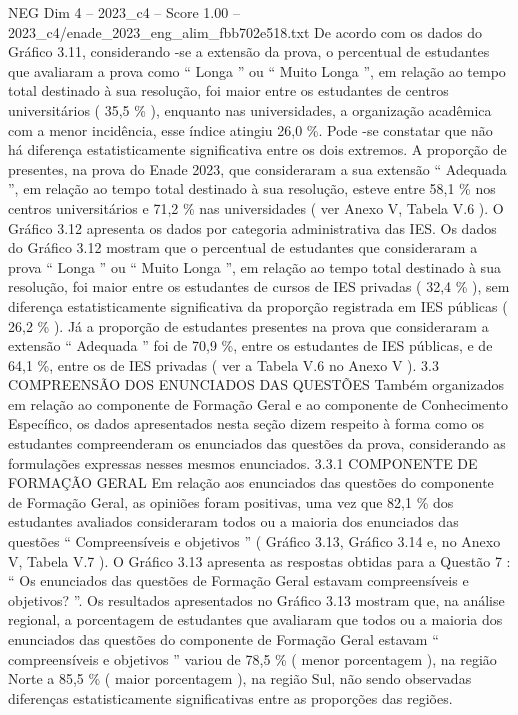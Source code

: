 \begin{textsample}{NEG Dim 4 – 2023\_c4 – Score 1.00 – 2023\_c4/enade\_2023\_eng\_alim\_fbb702e518.txt}
De acordo com os dados do Gráfico 3.11, considerando -se a extensão da prova, o percentual de estudantes que avaliaram a prova como “ Longa ” ou “ Muito Longa ”, em relação ao tempo total destinado à sua resolução, foi maior entre os estudantes de centros universitários ( 35,5 \% ), enquanto nas universidades, a organização acadêmica com a menor incidência, esse índice atingiu 26,0 \%.
Pode -se constatar que não há diferença estatisticamente significativa entre os dois extremos.
A proporção de presentes, na prova do Enade 2023, que consideraram a sua extensão “ Adequada ”, em relação ao tempo total destinado à sua resolução, esteve entre 58,1 \% nos centros universitários e 71,2 \% nas universidades ( ver Anexo V, Tabela V.6 ).
O Gráfico 3.12 apresenta os dados por categoria administrativa das IES.
Os dados do Gráfico 3.12 mostram que o percentual de estudantes que consideraram a prova “ Longa ” ou “ Muito Longa ”, em relação ao tempo total destinado à sua resolução, foi maior entre os estudantes de cursos de IES privadas ( 32,4 \% ), sem diferença estatisticamente significativa da proporção registrada em IES públicas ( 26,2 \% ).
Já a proporção de estudantes presentes na prova que consideraram a extensão “ Adequada ” foi de 70,9 \%, entre os estudantes de IES públicas, e de 64,1 \%, entre os de IES privadas ( ver a Tabela V.6 no Anexo V ). 3.3 COMPREENSÃO DOS ENUNCIADOS DAS QUESTÕES Também organizados em relação ao componente de Formação Geral e ao componente de Conhecimento Específico, os dados apresentados nesta seção dizem respeito à forma como os estudantes compreenderam os enunciados das questões da prova, considerando as formulações expressas nesses mesmos enunciados. 3.3.1 COMPONENTE DE FORMAÇÃO GERAL Em relação aos enunciados das questões do componente de Formação Geral, as opiniões foram positivas, uma vez que 82,1 \% dos estudantes avaliados consideraram todos ou a maioria dos enunciados das questões “ Compreensíveis e objetivos ” ( Gráfico 3.13, Gráfico 3.14 e, no Anexo V, Tabela V.7 ).
O Gráfico 3.13 apresenta as respostas obtidas para a Questão 7 : “ Os enunciados das questões de Formação Geral estavam compreensíveis e objetivos? ”.
Os resultados apresentados no Gráfico 3.13 mostram que, na análise regional, a porcentagem de estudantes que avaliaram que todos ou a maioria dos enunciados das questões do componente de Formação Geral estavam “ compreensíveis e objetivos ” variou de 78,5 \% ( menor porcentagem ), na região Norte a 85,5 \% ( maior porcentagem ), na região Sul, não sendo observadas diferenças estatisticamente significativas entre as proporções das regiões.

\end{textsample}
